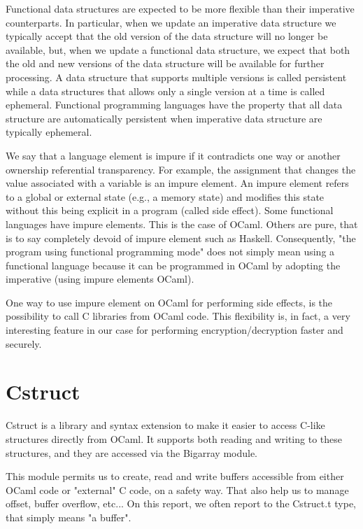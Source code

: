 \documentclass[10pt,a4paper]{report}
\begin{document}
Functional data structures are expected to be more flexible than their imperative counterparts. In particular, when we update an imperative data structure we typically accept that the old version of the data structure will no longer be available, but, when we update a functional data structure, we expect that both the old and new versions of the data structure will be available for further processing. A data structure that supports multiple versions is called persistent while a data structures that allows only a single version at a time is called ephemeral.
Functional programming languages have the property that all data structure are automatically persistent when imperative data structure are typically ephemeral.\newline

We say that a language element is impure if it contradicts one way or another ownership referential transparency. For example, the assignment that changes the value associated with a variable is an impure element. An impure element refers to a global or external state (e.g., a memory state) and modifies this state without this being explicit in a program (called side effect).
Some functional languages have impure elements. This is the case of OCaml.
Others are pure, that is to say completely devoid of impure element such as Haskell. Consequently, "the program using functional programming mode" does not simply mean using a functional language because it can be programmed in OCaml by adopting the imperative (using impure elements OCaml).\newline

One way to use impure element on OCaml for performing side effects, is the possibility to call C libraries from OCaml code.
This flexibility is, in fact, a very interesting feature in our case for performing encryption/decryption faster and securely. 

\section{Cstruct}

Cstruct is a library and syntax extension to make it easier to access C-like structures directly from OCaml. It supports both reading and writing to these structures, and they are accessed via the Bigarray module.\newline 

This module permits us to create, read and write buffers accessible from either OCaml code or "external" C code, on a safety way.
That also help us to manage offset, buffer overflow, etc... 
On this report, we often report to the Cstruct.t type, that simply means "a buffer".\newline
\end{document}
